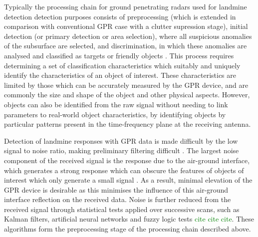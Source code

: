 \documentclass[main.tex]{subfiles}
\begin{document}
Typically the processing chain for ground penetrating radars used for landmine detection detection purposes consists of preprocessing (which is extended in comparison with conventional GPR case with a clutter supression stage), initial detection (or primary detection or area selection), where all suspicious anomalies of the subsurface are selected, and discrimination, in which these anomalies are analysed and classified as targets or friendly objects \parencite{Ho.etal2004}. This process requires determining a set of classification characteristics which suitably and uniquely identify the characteristics of an object of interest. These characteristics are limited by those which can be accurately measured by the GPR device, and are commonly the size and shape of the object and other physical aspects. However, objects can also be identified from the raw signal without needing to link parameters to real-world object characteristics, by identifying objects by particular patterns present in the time-frequency plane at the receiving antenna. 

Detection of landmine responses with GPR data is made difficult by the low signal to noise ratio, making preliminary filtering difficult \parencite{Yarovoy2009}. The largest noise component of the received signal is the response due to the air-ground interface, which generates a strong response which can obscure the features of objects of interest which only generate a small signal \parencite{Yarovoy2009}. As a result, minimal elevation of the GPR device is desirable as this minimises the influence of this air-ground interface reflection on the received data. Noise is further reduced from the received signal through statistical tests applied over successive scans, such as Kalman filters, artificial neural networks and fuzzy logic tests \textcolor{green}{cite cite cite}. These algorithms form the preprocessing stage of the processing chain described above.
\end{document}
